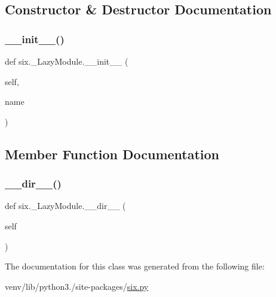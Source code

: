 \subsection{Constructor \& Destructor Documentation}
\mbox{\label{classsix_1_1__LazyModule_a7c22088db3bceb8a372f3547d9ddfd53}} 
\subsubsection{\texorpdfstring{\+\_\+\+\_\+init\+\_\+\+\_\+()}{\_\_init\_\_()}}
{\footnotesize\ttfamily def six.\+\_\+\+Lazy\+Module.\+\_\+\+\_\+init\+\_\+\+\_\+ (\begin{DoxyParamCaption}\item[{}]{self,  }\item[{}]{name }\end{DoxyParamCaption})}



\subsection{Member Function Documentation}
\mbox{\label{classsix_1_1__LazyModule_a3550253661aad92848159f3074e2e9c5}} 
\subsubsection{\texorpdfstring{\+\_\+\+\_\+dir\+\_\+\+\_\+()}{\_\_dir\_\_()}}
{\footnotesize\ttfamily def six.\+\_\+\+Lazy\+Module.\+\_\+\+\_\+dir\+\_\+\+\_\+ (\begin{DoxyParamCaption}\item[{}]{self }\end{DoxyParamCaption})}



The documentation for this class was generated from the following file\+:\begin{DoxyCompactItemize}
\item 
venv/lib/python3./site-\/packages/\hyperlink{six_8py}{six.\+py}\end{DoxyCompactItemize}
